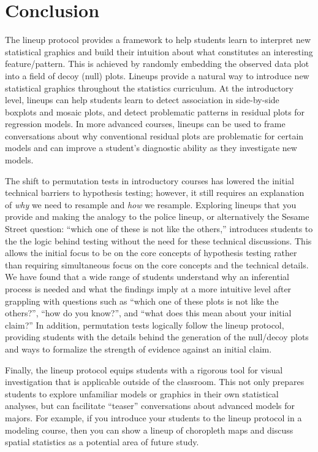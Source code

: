 \documentclass[12pt]{article}
\begin{document}
\hypertarget{conclusion}{%
\section{Conclusion}\label{conclusion}}

\label{sec:conclusion}

The lineup protocol provides a framework to help students learn to
interpret new statistical graphics and build their intuition about what
constitutes an interesting feature/pattern. This is achieved by randomly
embedding the observed data plot into a field of decoy (null) plots.
Lineups provide a natural way to introduce new statistical graphics
throughout the statistics curriculum. At the introductory level, lineups
can help students learn to detect association in side-by-side boxplots
and mosaic plots, and detect problematic patterns in residual plots for
regression models. In more advanced courses, lineups can be used to
frame conversations about why conventional residual plots are
problematic for certain models and can improve a student's diagnostic
ability as they investigate new models.

The shift to permutation tests in introductory courses has lowered the
initial technical barriers to hypothesis testing; however, it still
requires an explanation of \emph{why} we need to resample and \emph{how}
we resample. Exploring lineups that you provide and making the analogy
to the police lineup, or alternatively the Sesame Street question:
``which one of these is not like the others,'' introduces students to
the the logic behind testing without the need for these technical
discussions. This allows the initial focus to be on the core concepts of
hypothesis testing rather than requiring simultaneous focus on the core
concepts and the technical details. We have found that a wide range of
students understand why an inferential process is needed and what the
findings imply at a more intuitive level after grappling with questions
such as ``which one of these plots is not like the others?'', ``how do
you know?'', and ``what does this mean about your initial claim?'' In
addition, permutation tests logically follow the lineup protocol,
providing students with the details behind the generation of the
null/decoy plots and ways to formalize the strength of evidence against
an initial claim.

Finally, the lineup protocol equips students with a rigorous tool for
visual investigation that is applicable outside of the classroom. This
not only prepares students to explore unfamiliar models or graphics in
their own statistical analyses, but can facilitate ``teaser''
conversations about advanced models for majors. For example, if you
introduce your students to the lineup protocol in a modeling course,
then you can show a lineup of choropleth maps and discuss spatial
statistics as a potential area of future study.
\end{document}
